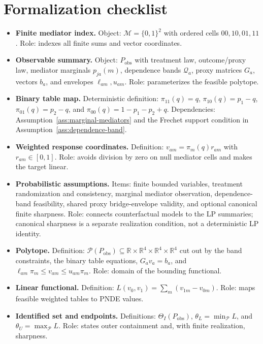 \documentclass[11pt]{article}
\newcommand{\R}{\mathbb{R}}
\theoremstyle{definition}
\theoremstyle{plain}
\theoremstyle{remark}
\begin{document}
\section{Formalization checklist}
\begin{itemize}[leftmargin=*]
\item \textbf{Finite mediator index.}  Object:
\(\mathcal M=\{0,1\}^2\) with ordered cells \(00,10,01,11\).  Role:
indexes all finite sums and vector coordinates.

\item \textbf{Observable summary.}  Object:
\(P_{\mathrm{obs}}\) with treatment law, outcome/proxy law, mediator
marginals \(p_{ja}(m)\), dependence bands \(\mathcal Q_a\), proxy matrices
\(G_a\), vectors \(b_a\), and envelopes \(\ell_{am},u_{am}\).  Role:
parameterizes the feasible polytope.

\item \textbf{Binary table map.}  Deterministic definition:
\(\pi_{11}(q)=q\), \(\pi_{10}(q)=p_1-q\),
\(\pi_{01}(q)=p_2-q\), and
\(\pi_{00}(q)=1-p_1-p_2+q\).  Dependencies:
Assumption~\ref{ass:marginal-mediators} and the Frechet support condition in
Assumption~\ref{ass:dependence-band}.

\item \textbf{Weighted response coordinates.}  Definition:
\(v_{am}=\pi_m(q)r_{am}\) with \(r_{am}\in[0,1]\).  Role:
avoids division by zero on null mediator cells and makes the target linear.

\item \textbf{Probabilistic assumptions.}  Items:
finite bounded variables, treatment randomization and consistency, marginal
mediator observation, dependence-band feasibility, shared proxy
bridge-envelope validity, and optional canonical finite sharpness.  Role:
connects counterfactual models to the LP summaries; canonical sharpness is a
separate realization condition, not a deterministic LP identity.

\item \textbf{Polytope.}  Definition:
\(\mathcal P(P_{\mathrm{obs}})\subseteq
\R\times\R^4\times\R^4\times\R^4\) cut out by the band constraints, the
binary table equations, \(G_a v_a=b_a\), and
\(\ell_{am}\pi_m\le v_{am}\le u_{am}\pi_m\).  Role:
domain of the bounding functional.

\item \textbf{Linear functional.}  Definition:
 \(L(v_0,v_1)=\sum_m(v_{1m}-v_{0m})\).  Role:
maps feasible weighted tables to PNDE values.

\item \textbf{Identified set and endpoints.}  Definitions:
\(\Theta_I(P_{\mathrm{obs}})\), \(\theta_L=\min_{\mathcal P}L\), and
\(\theta_U=\max_{\mathcal P}L\).  Role:
states outer containment and, with finite realization, sharpness.


\end{itemize}
\end{document}
